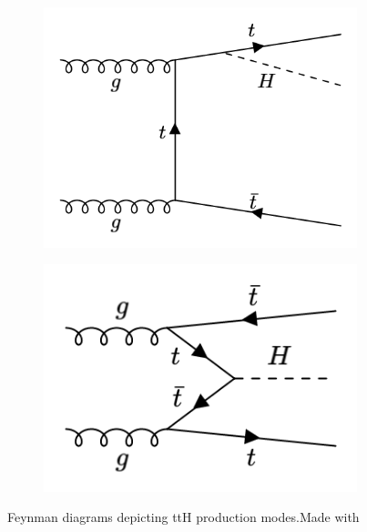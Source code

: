 \begin{figure}[htp]
\begin{subfigure}[b]{0.3\textwidth}
         \includegraphics[width=\textwidth]{figures/theory_chapter/ttH3.png}
         \label{fig:ttH3}
     \end{subfigure}
     \hfill
         \begin{subfigure}[b]{0.3\textwidth}
         \centering
         \includegraphics[width=\textwidth]{figures/theory_chapter/ttH4.png}
         \label{fig:ttH4}
     \end{subfigure}
     \hfill 
  \label{fig:loopmodes}
  \caption{Feynman diagrams depicting ttH production modes.Made with \cite{FeynmanMaker}}  
\end{figure}

